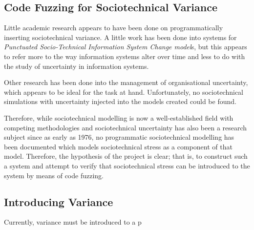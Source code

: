 \subsection{Code Fuzzing for Sociotechnical Variance}
Little academic research appears to have been done on programmatically inserting sociotechnical variance. A little work has been done into systems for \emph{Punctuated Socio-Technical Information System Change model}s\cite{Lyytinen2008}, but this appears to refer more to the way information systems alter over time and less to do with the study of uncertainty in information systems. \par
Other research has been done into the management of organisational uncertainty\cite{Grote2004}\cite{Herrmann1999}, which appears to be ideal for the task at hand. Unfortunately, no sociotechnical simulations with uncertainty injected into the models created could be found. \par
Therefore, while sociotechnical modelling is now a well-established field with competing methodologies and sociotechnical uncertainty has also been a research subject since as early as 1976\cite{Susman1976}, no programmatic sociotechnical modelling has been documented which models sociotechnical stress as a component of that model. Therefore, the hypothesis of the project is clear; that is, to construct such a system and attempt to verify that sociotechnical stress can be introduced to the system by means of code fuzzing. \par


\subsection{Introducing Variance}
\label{Variance_research}
Currently, variance must be introduced to a p 

